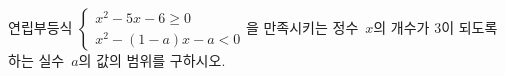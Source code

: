연립부등식 $\begin{cases} x^2-5x-6\ge 0 \\ x^2-(1-a)x-a<0 \end{cases}$을 만족시키는 정수~$x$의 개수가 $3$이 되도록 하는 실수~$a$의 값의 범위를 구하시오.

